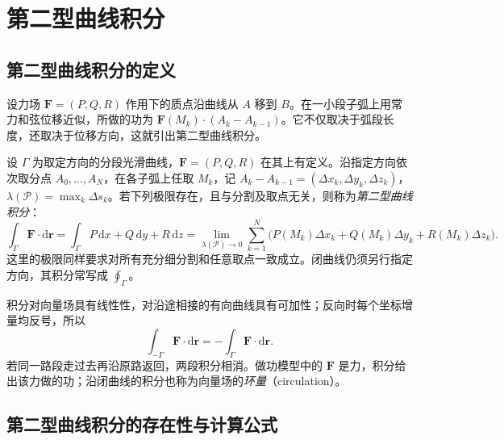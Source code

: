 \documentclass[UTF8,12pt,a4paper,fontset=fandol]{ctexbook}
\begin{document}
\section{第二型曲线积分}
\label{sec:line-integrals-of-the-second-kind}

\subsection{第二型曲线积分的定义}
\label{subsec:definition-of-line-integrals-of-the-second-kind}

设力场 $\boldsymbol F=(P,Q,R)$ 作用下的质点沿曲线从 $A$ 移到 $B$。在一小段子弧上用常力和弦位移近似，所做的功为 $\boldsymbol F(M_k)\cdot(A_k-A_{k-1})$。它不仅取决于弧段长度，还取决于位移方向，这就引出第二型曲线积分。

\begin{definition}
\label{def:line-integral-second-kind}
设 $\Gamma$ 为取定方向的分段光滑曲线，$\boldsymbol F=(P,Q,R)$ 在其上有定义。沿指定方向依次取分点 $A_0,\ldots,A_N$，在各子弧上任取 $M_k$，记 $A_k-A_{k-1}=(\Delta x_k,\Delta y_k,\Delta z_k)$，$\lambda(\mathcal P)=\max_k\Delta s_k$。若下列极限存在，且与分割及取点无关，则称为\emph{第二型曲线积分}：
\begin{equation}
\label{eq:second-line-integral-definition}
    \int_\Gamma\boldsymbol F\cdot\mathrm d\boldsymbol r
    =\int_\Gamma P\,\mathrm dx+Q\,\mathrm dy+R\,\mathrm dz
    =\lim_{\lambda(\mathcal P)\to0}
      \sum_{k=1}^N\bigl(P(M_k)\Delta x_k+Q(M_k)\Delta y_k+R(M_k)\Delta z_k\bigr).
\end{equation}
这里的极限同样要求对所有充分细分割和任意取点一致成立。闭曲线仍须另行指定方向，其积分常写成 $\oint_\Gamma$。
\end{definition}

积分对向量场具有线性性，对沿途相接的有向曲线具有可加性；反向时每个坐标增量均反号，所以
\[
    \int_{-\Gamma}\boldsymbol F\cdot\mathrm d\boldsymbol r
    =-\int_\Gamma\boldsymbol F\cdot\mathrm d\boldsymbol r.
\]
若同一路段走过去再沿原路返回，两段积分相消。做功模型中的 $\boldsymbol F$ 是力，积分给出该力做的功；沿闭曲线的积分也称为向量场的\emph{环量}（circulation）。

\subsection{第二型曲线积分的存在性与计算公式}
\label{subsec:existence-and-evaluation-of-line-integrals-of-the-second-kind}
\end{document}
